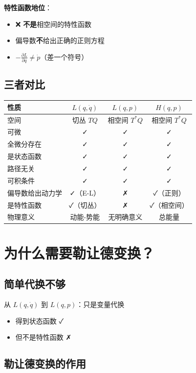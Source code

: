 \documentclass[12pt,a4paper]{article}
\begin{document}
\textbf{特性函数地位}：
\begin{itemize}
\item ❌ \textbf{不是}相空间的特性函数
\item 偏导数\textbf{不}给出正确的正则方程
\item $-\frac{\partial L}{\partial q} \neq \dot{p}$（差一个符号）
\end{itemize}

\subsection{三者对比}

\begin{table}[h]
\centering
\small
\begin{tabular}{lccc}
\toprule
\textbf{性质} & $L(q, \dot{q})$ & $L(q, p)$ & $H(q, p)$ \\
\midrule
空间 & 切丛 $TQ$ & 相空间 $T^*Q$ & 相空间 $T^*Q$ \\
可微 & ✓ & ✓ & ✓ \\
全微分存在 & ✓ & ✓ & ✓ \\
是状态函数 & ✓ & ✓ & ✓ \\
路径无关 & ✓ & ✓ & ✓ \\
可积条件 & ✓ & ✓ & ✓ \\
偏导数给出动力学 & ✓（E-L） & ✗ & ✓（正则） \\
是特性函数 & ✓（切丛） & ✗ & ✓（相空间） \\
物理意义 & 动能-势能 & 无明确意义 & 总能量 \\
\bottomrule
\end{tabular}
\end{table}

\section{为什么需要勒让德变换？}

\subsection{简单代换不够}

从 $L(q, \dot{q})$ 到 $L(q, p)$：只是变量代换

\begin{itemize}
\item 得到状态函数 ✓
\item 但不是特性函数 ✗
\end{itemize}

\subsection{勒让德变换的作用}
\end{document}
